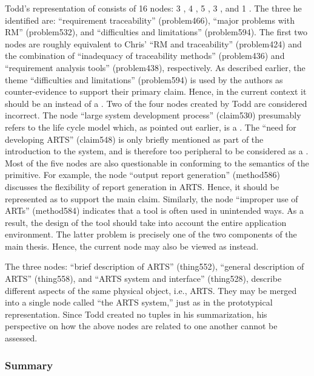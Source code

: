 Todd's representation of \cite{Flynn90} consists of 16 nodes: 3 , 4 , 5 , 3 , and 1 . The three  he
identified are: ``requirement traceability'' (problem466), ``major problems
with RM'' (problem532), and ``difficulties and limitations'' (problem594).
The first two nodes are roughly equivalent to Chris' ``RM and
traceability'' (problem424) and the combination of ``inadequacy of
traceability methods'' (problem436) and ``requirement analysis tools''
(problem438), respectively. As described earlier, the theme ``difficulties
and limitations'' (problem594) is used by the authors as counter-evidence
to support their primary claim. Hence, in the current context it should be
an  instead of a . Two of the four
 nodes created by Todd are considered incorrect. The node
``large system development process'' (claim530) presumably refers to the
life cycle model which, as pointed out earlier, is a .
The ``need for developing ARTS'' (claim548) is only briefly mentioned as
part of the introduction to the system, and is therefore too peripheral to
be considered as a . Most of the five 
nodes are also questionable in conforming to the semantics of the
primitive. For example, the node ``output report generation'' (method586)
discusses the flexibility of report generation in ARTS. Hence, it should be
represented as  to support the main claim. Similarly,
the node ``improper use of ARTs'' (method584) indicates that a tool is
often used in unintended ways.  As a result, the design of the tool should
take into account the entire application environment. The latter problem is
precisely one of the two components of the main thesis. Hence, the current
node may also be viewed as  instead.

The three  nodes: ``brief description of ARTS''
(thing552), ``general description of ARTS'' (thing558), and ``ARTS system
and interface'' (thing528), describe different aspects of the same physical
object, i.e., ARTS. They may be merged into a single 
node called ``the ARTS system,'' just as in the prototypical
representation. Since Todd created no tuples in his summarization, his
perspective on how the above nodes are related to one another cannot be
assessed.

\subsubsection{Summary}

